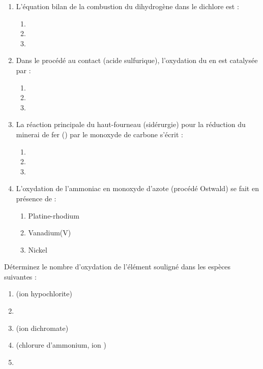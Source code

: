 \documentclass[11pt]{article}
\begin{document}
\begin{exercice}
\begin{enumerate}
    \item L'équation bilan de la combustion du dihydrogène dans le dichlore est :
    \begin{enumerate}
        \item {}
        \item {}
        \item {}
    \end{enumerate}
    \item Dans le procédé au contact (acide sulfurique), l'oxydation du  en  est catalysée par :
    \begin{enumerate}
        \item {}
        \item {}
        \item {}
    \end{enumerate}
    \item La réaction principale du haut-fourneau (sidérurgie) pour la réduction du minerai de fer () par le monoxyde de carbone s'écrit :
    \begin{enumerate}
        \item {}
        \item {}
        \item {}
    \end{enumerate}
    \item L'oxydation de l'ammoniac  en monoxyde d'azote  (procédé Ostwald) se fait en présence de :
    \begin{enumerate}
        \item Platine-rhodium
        \item Vanadium(V)
        \item Nickel
    \end{enumerate}
\end{enumerate}
\end{exercice}

\begin{exercice}
Déterminez le nombre d'oxydation de l'élément souligné dans les espèces suivantes :
\begin{enumerate}
    \item {} \quad (ion hypochlorite)
    \item {}
    \item {} \quad (ion dichromate)
    \item {} \quad (chlorure d'ammonium, ion )
    \item {}
\end{enumerate}
\end{exercice}
\end{document}
